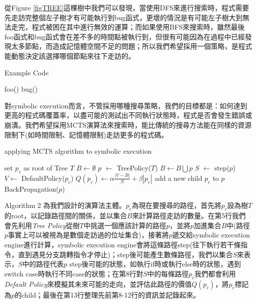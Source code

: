 \documentclass[12pt,a4paper,oneside]{book}
\begin{document}
從Figure \ref{figTREE}這棵樹中我們可以發現，當使用DFS來進行搜索時，程式需要先走訪完整個左子樹才有可能執行到bug函式，更壞的情況是有可能左子樹大到無法走完，程式被困在其中進行無效的運算；而如果使用BFS來搜索時，雖然最後foo函式和bug函式會在差不多的時間點被執行到，但很有可能因為在過程中已經發現太多節點，而造成記憶體空間不足的問題；所以我們希望採用一個策略，是程式能動態決定該選擇哪個節點來往下走訪的。

\newpage

\begin{algorithm}[htbp]
  \caption{Example Code}
  \begin{algorithmic}[1]
                	\State foo()
                \EndIf
            \EndIf
        \EndIf
    \Else
                	\State bug()
                \EndIf
            \EndIf
        \EndIf
    \EndIf
  \end{algorithmic}
\end{algorithm}

對symbolic execution而言，不管採用哪種搜尋策略，我們的目標都是：如何達到更高的程式碼覆蓋率，以盡可能的測試出不同執行狀態時，程式是否會發生錯誤或崩潰。我們希望採用MCTS演算法來搜索時，能比傳統的搜尋方法能在同樣的資源限制下(如時間限制、記憶體限制)走訪更多的程式碼。

\begin{algorithm}[htbp]
  \caption{applying MCTS algorithm to symbolic execution}
  \begin{algorithmic}[1]
    \State set $p_r$ as root of Tree $T$
    \State $B \leftarrow \emptyset$
      \State $p$ $\leftarrow$ TreePolicy($T$)
      \State $B \leftarrow B \bigcup p$
      \State $S$ $\leftarrow$ step($p$)
      	\State $V \leftarrow$ DefaultPolicy($p_c$)
        \State $Q(p_c) \leftarrow \alpha \frac{|V-B|}{N} + \beta|p_c|$
        \State add a new child $p_c$ to $p$
      \EndFor
      \State BackPropagation($p$)
    \EndWhile
    \EndFunction
  \end{algorithmic}
\end{algorithm}

Algorithm 2 為我們設計的演算法主體。$p_r$為現在要搜尋的路徑，首先將$p_r$設為樹$T$的root，以記錄路徑間的關係，並以集合$B$來計算路徑走訪的數量。在第5行我們會先利用\textit{Tree Policy}從樹$T$中挑選一個應該計算的路徑$p$，並將$p$加進集合$B$中(路徑$p$事實上可以被視為是數個走訪過的位址集合)，接著將$p$遞交給symbolic execution engine進行計算，symbolic execution engine會將這條路徑step(往下執行若干條指令，直到遇見分支跳轉指令才停止)；step後可能產生數條路徑，我們以集合$S$來表示，$S$中的路徑代表$p$ step後可能的狀態，如執行if時或執行else時的狀態，遇到switch case時執行不同case的狀態；在第8行對$S$中的每條路徑$p_c$我們都會利用\textit{Default Policy}來模擬其未來可能的走向，並評估此路徑的價值$Q(p_c)$，將$p_c$標記為$p$的child；最後在第13行整理先前第8-12行的資訊並記錄起來。
\end{document}
